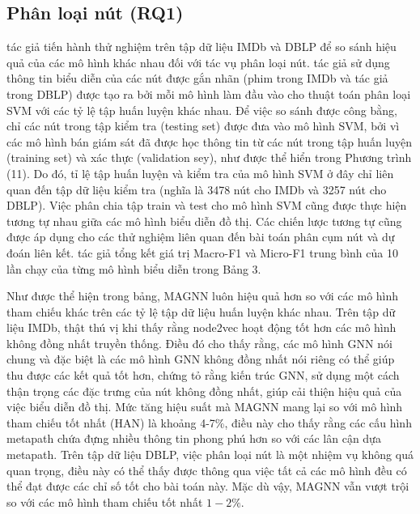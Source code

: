 \subsection{Phân loại nút (RQ1)}
tác giả tiến hành thử nghiệm trên tập dữ liệu IMDb và DBLP để so sánh hiệu quả của các mô hình khác nhau đối với tác vụ phân loại nút. tác giả sử dụng thông tin biểu diễn của các nút được gắn nhãn (phim trong IMDb và tác giả trong DBLP) được tạo ra bởi mỗi mô hình làm đầu vào cho thuật toán phân loại SVM với các tỷ lệ tập huấn luyện khác nhau. Để việc so sánh được công bằng, chỉ các nút trong tập kiểm tra (testing set) được đưa vào mô hình SVM, bởi vì các mô hình bán giám sát đã được học thông tin từ các nút trong tập huấn luyện (training set) và xác thực (validation sey), như được thể hiển trong Phương trình (11). Do đó, tỉ lệ tập huấn luyện và kiểm tra của mô hình SVM ở đây chỉ liên quan đến tập dữ liệu kiểm tra (nghĩa là 3478 nút cho IMDb và 3257 nút cho DBLP). Việc phân chia tập train và test cho mô hình SVM cũng được thực hiện tương tự nhau giữa các mô hình biểu diễn đồ thị. Các chiến lược tương tự cũng được áp dụng cho các thử nghiệm liên quan đến bài toán phân cụm nút và dự đoán liên kết. tác giả tổng kết giá trị Macro-F1 và Micro-F1 trung bình của 10 lần chạy của từng mô hình biểu diễn trong Bảng 3.

Như được thể hiện trong bảng, MAGNN luôn hiệu quả hơn so với các mô hình tham chiếu khác trên các tỷ lệ tập dữ liệu huấn luyện khác nhau. Trên tập dữ liệu IMDb, thật thú vị khi thấy rằng node2vec hoạt động tốt hơn các mô hình không đồng nhất truyền thống. Điều đó cho thấy rằng, các mô hình GNN nói chung và đặc biệt là các mô hình GNN không đồng nhất nói riêng có thể giúp thu được các kết quả tốt hơn, chứng tỏ rằng kiến trúc GNN, sử dụng một cách thận trọng các đặc trưng của nút không đồng nhất, giúp cải thiện hiệu quả của việc biểu diễn đồ thị. Mức tăng hiệu suất mà MAGNN mang lại so với mô hình tham chiếu tốt nhất (HAN) là khoảng 4-7\%, điều này cho thấy rằng các cấu hình metapath chứa đựng nhiều thông tin phong phú hơn so với các lân cận dựa metapath. Trên tập dữ liệu DBLP, việc phân loại nút là một nhiệm vụ không quá quan trọng, điều này có thể thấy được thông qua việc tất cả các mô hình đều có thể đạt được các chỉ số tốt cho bài toán này. Mặc dù vậy, MAGNN vẫn vượt trội so với các mô hình tham chiếu tốt nhất $1-2 \%$.

